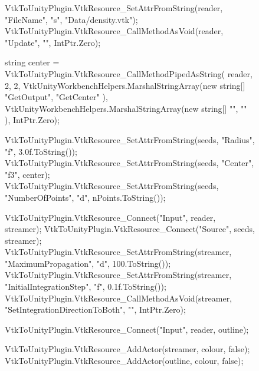 \begin{appendices}
\begin{figure}[ht!]
\begin{cs}[label=lst:StremTracerVtkInst,caption={C\# calls to create a VTK stream tracer in Unity.}]
VtkToUnityPlugin.VtkResource_SetAttrFromString(reader, "FileName", "s", "Data/density.vtk");
VtkToUnityPlugin.VtkResource_CallMethodAsVoid(reader, "Update", "", IntPtr.Zero);

string center = VtkToUnityPlugin.VtkResource_CallMethodPipedAsString(
    reader,
    2,
    2,
    VtkUnityWorkbenchHelpers.MarshalStringArray(new string[] { "GetOutput", "GetCenter" }),
    VtkUnityWorkbenchHelpers.MarshalStringArray(new string[] { "", "" }),
    IntPtr.Zero);

VtkToUnityPlugin.VtkResource_SetAttrFromString(seeds, "Radius", "f", 3.0f.ToString());
VtkToUnityPlugin.VtkResource_SetAttrFromString(seeds, "Center", "f3", center);
VtkToUnityPlugin.VtkResource_SetAttrFromString(seeds, "NumberOfPoints", "d", nPoints.ToString());

VtkToUnityPlugin.VtkResource_Connect("Input", reader, streamer);
VtkToUnityPlugin.VtkResource_Connect("Source", seeds, streamer);
VtkToUnityPlugin.VtkResource_SetAttrFromString(streamer, "MaximumPropagation", "d", 100.ToString());
VtkToUnityPlugin.VtkResource_SetAttrFromString(streamer, "InitialIntegrationStep", "f", 0.1f.ToString());
VtkToUnityPlugin.VtkResource_CallMethodAsVoid(streamer, "SetIntegrationDirectionToBoth", "", IntPtr.Zero);

VtkToUnityPlugin.VtkResource_Connect("Input", reader, outline);

VtkToUnityPlugin.VtkResource_AddActor(streamer, colour, false);
VtkToUnityPlugin.VtkResource_AddActor(outline, colour, false);
    \end{cs}
\end{figure}

\end{appendices}
